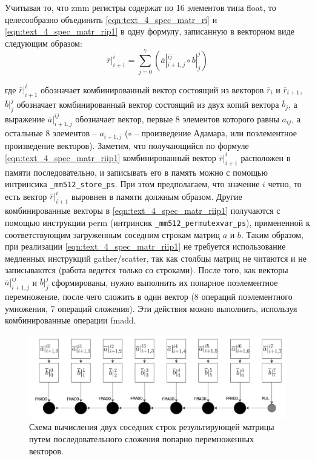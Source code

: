 Учитывая то, что zmm регистры содержат по 16 элементов типа float, то целесообразно объединить \eqref{eqn:text_4_spec_matr_ri} и \eqref{eqn:text_4_spec_matr_rip1} в одну формулу, записанную в векторном виде следующим образом:
\begin{equation}\label{eqn:text_4_spec_matr_riip1}
	\overline{r}|_{i + 1}^i
	=
	\sum_{j = 0}^{7} \left(  \overline{a}|_{i + 1,j}^{ij} \circ \overline{b}|_j^j \right)
\end{equation}

где $\overline{r}|_{i + 1}^i$ обозначает комбинированный вектор состоящий из векторов $\overline{r}_i$ и $\overline{r}_{i + 1}$, $\overline{b}|_j^j$ обозначает комбинированный вектор состоящий из двух копий вектора $\overline{b}_j$, а выражение $\overline{a}|_{i + 1,j}^{ij}$ обозначает вектор, первые 8 элементов которого равны $a_{ij}$, а остальные 8 элементов -- $a_{i + 1,j}$ ($\circ$ -- произведение Адамара, или поэлементное произведение векторов).
Заметим, что получающийся по формуле \eqref{eqn:text_4_spec_matr_riip1} комбинированный вектор $\overline{r}|_{i + 1}^i$ расположен в памяти последовательно, и записывать его в память можно с помощью интринсика \texttt{\_mm512\_store\_ps}.
При этом предполагаем, что значение $i$ четно, то есть вектор $\overline{r}|_{i + 1}^i$ выровнен в памяти должным образом.
Другие комбинированные векторы в \eqref{eqn:text_4_spec_matr_riip1} получаются с помощью инструкции perm (интринсик \texttt{\_mm512\_permutexvar\_ps}), примененной к соответствующим загруженным соседним строкам матриц $a$ и $b$.
Таким образом, при реализации \eqref{eqn:text_4_spec_matr_riip1} не требуется использование медленных инструкций gather/scatter, так как столбцы матриц не читаются и не записываются (работа ведется только со строками).
После того, как векторы $\overline{a}|_{i + 1,j}^{ij}$ и $\overline{b}|_j^j$ сформированы, нужно выполнить их попарное поэлементное перемножение, после чего сложить в один вектор (8 операций поэлементного умножения, 7 операций сложения).
Эти действия можно выполнить, используя комбинированные операции fmadd.

\begin{figure}[ht]
\centering
\includegraphics[width=1.00\textwidth]{./pics/text_4_spec_matr/fmadd.pdf}
\singlespacing
{}\caption{Схема вычисления двух соседних строк результирующей матрицы путем последовательного сложения попарно перемноженных векторов.}
\label{fig:text_4_spec_matr_fmadd}
\end{figure}

